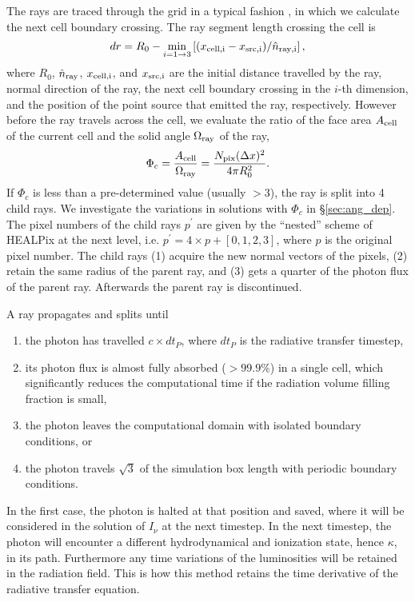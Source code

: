 \documentclass[useAMS,usenatbib]{mn2e}
\begin{document}
The rays are traced through the grid in a typical fashion
\citep[e.g.][]{Abel99_RT}, in which we calculate the next cell
boundary crossing.  The ray segment length crossing the cell is
%
\begin{equation}
  \label{eqn:trace}
  dr = R_0 - \min_{i=1 \rightarrow 3} \left[(x_{\rm cell,i} - x_{\rm src,i}) /
    \hat{n}_{\rm ray,i} \right],
\end{equation}
%
where $R_0$, $\hat{n}_{\rm ray}$, $x_{\rm cell,i}$, and $x_{\rm
  src,i}$ are the initial distance travelled by the ray, normal
direction of the ray, the next cell boundary crossing in the $i$-th
dimension, and the position of the point source that emitted the ray,
respectively.  However before the ray travels across the cell, we
evaluate the ratio of the face area $A_{\rm cell}$ of the current cell
and the solid angle $\Omega_{\rm ray}$ of the ray,
%
\begin{equation}
  \label{eqn:split}
  \Phi_c = \frac{A_{\rm cell}} {\Omega_{\rm ray}} = 
  \frac{N_{\rm pix} (\Delta x)^2} {4\pi R_0^2}.
\end{equation}
%
If $\Phi_c$ is less than a pre-determined value (usually $>3$), the
ray is split into 4 child rays.  We investigate the variations in
solutions with $\Phi_c$ in \S\ref{sec:ang_dep}.  The pixel numbers
of the child rays $p^\prime$ are given by the ``nested'' scheme of
HEALPix at the next level, i.e. $p^\prime = 4 \times p + [0,1,2,3]$,
where $p$ is the original pixel number.  The child rays (1) acquire
the new normal vectors of the pixels, (2) retain the same radius of
the parent ray, and (3) gets a quarter of the photon flux of the
parent ray.  Afterwards the parent ray is discontinued.

A ray propagates and splits until 
%
\begin{enumerate}
\item the photon has travelled $c \times dt_P$, where $dt_P$ is the
  radiative transfer timestep,
\item its photon flux is almost fully absorbed ($>99.9\%$) in a single
  cell, which significantly reduces the computational time if the
  radiation volume filling fraction is small,
\item the photon leaves the computational domain with isolated
  boundary conditions, or
\item the photon travels $\sqrt{3}$ of the simulation box length with
  periodic boundary conditions.
\end{enumerate}
%
In the first case, the photon is halted at that position and saved,
where it will be considered in the solution of $I_\nu$ at the next
timestep.  In the next timestep, the photon will encounter a different
hydrodynamical and ionization state, hence $\kappa$, in its path.
Furthermore any time variations of the luminosities will be retained
in the radiation field.  This is how this method retains the time
derivative of the radiative transfer equation.
\end{document}
